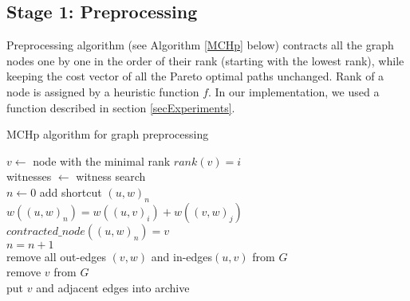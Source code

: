 

\subsection{Stage 1: Preprocessing} \label{subsecStage1}

Preprocessing algorithm (see Algorithm \ref{MCHp} below) contracts all the
graph nodes one by one in the order of their rank (starting with the lowest
rank), while keeping the cost vector of all the Pareto optimal paths unchanged.
Rank of a node is assigned by a heuristic function $f$. In our implementation,
we used a function described in section \ref{secExperiments}.

\vskip 5mm
\begin{algorithm}[H]
    \SetAlgoLined
    \LinesNumbered
    \caption{MCHp algorithm for graph preprocessing}
    \label{MCHp}
     {
        $v \leftarrow $ node with the minimal rank
        $rank(v) = i$ \\
        witnesses $\leftarrow$ witness search \\
        $n \leftarrow 0$  
         {
             {
                add shortcut $(u,w)_n$ \\
                $w((u,w)_n) = w((u,v)_i)+w((v,w)_j)$ \\
                $contracted\_node((u,w)_n) = v$ \\
                $n = n+1$ \\
            }
        }
        remove all out-edges $(v,w)$ and in-edges$(u,v)$ from $G$ \\
        remove $v$ from $G$ \\
        put $v$ and adjacent edges into archive 
    }
    \vskip 5mm
\end{algorithm}
\vskip 5mm

